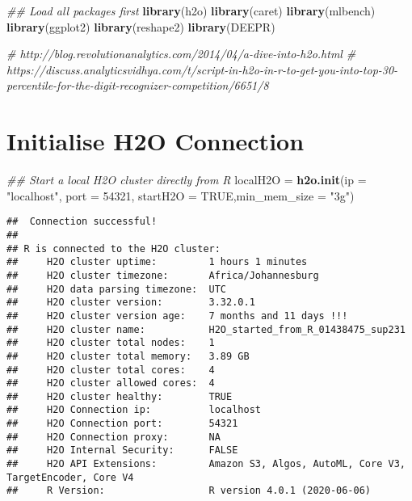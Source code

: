 \documentclass[
]{book}
\newenvironment{Shaded}{\begin{snugshade}}{\end{snugshade}}
\newcommand{\CommentTok}[1]{\textcolor[rgb]{0.56,0.35,0.01}{\textit{#1}}}
\newcommand{\DataTypeTok}[1]{\textcolor[rgb]{0.13,0.29,0.53}{#1}}
\newcommand{\DecValTok}[1]{\textcolor[rgb]{0.00,0.00,0.81}{#1}}
\newcommand{\KeywordTok}[1]{\textcolor[rgb]{0.13,0.29,0.53}{\textbf{#1}}}
\newcommand{\NormalTok}[1]{#1}
\newcommand{\OtherTok}[1]{\textcolor[rgb]{0.56,0.35,0.01}{#1}}
\newcommand{\StringTok}[1]{\textcolor[rgb]{0.31,0.60,0.02}{#1}}
\begin{document}
\begin{Shaded}
\begin{Highlighting}[]
\CommentTok{## Load all packages first}
\KeywordTok{library}\NormalTok{(h2o)}
\KeywordTok{library}\NormalTok{(caret)}
\KeywordTok{library}\NormalTok{(mlbench)}
\KeywordTok{library}\NormalTok{(ggplot2)}
\KeywordTok{library}\NormalTok{(reshape2)}
\KeywordTok{library}\NormalTok{(DEEPR)}

\CommentTok{# http://blog.revolutionanalytics.com/2014/04/a-dive-into-h2o.html}
\CommentTok{# https://discuss.analyticsvidhya.com/t/script-in-h2o-in-r-to-get-you-into-top-30-percentile-for-the-digit-recognizer-competition/6651/8}
\end{Highlighting}
\end{Shaded}

\hypertarget{initialise-h2o-connection}{%
\section{Initialise H2O Connection}\label{initialise-h2o-connection}}

\begin{Shaded}
\begin{Highlighting}[]
\CommentTok{## Start a local H2O cluster directly from R}
\NormalTok{localH2O =}\StringTok{ }\KeywordTok{h2o.init}\NormalTok{(}\DataTypeTok{ip =} \StringTok{"localhost"}\NormalTok{, }\DataTypeTok{port =} \DecValTok{54321}\NormalTok{, }\DataTypeTok{startH2O =} \OtherTok{TRUE}\NormalTok{,}\DataTypeTok{min_mem_size =} \StringTok{"3g"}\NormalTok{)}
\end{Highlighting}
\end{Shaded}

\begin{verbatim}
##  Connection successful!
## 
## R is connected to the H2O cluster: 
##     H2O cluster uptime:         1 hours 1 minutes 
##     H2O cluster timezone:       Africa/Johannesburg 
##     H2O data parsing timezone:  UTC 
##     H2O cluster version:        3.32.0.1 
##     H2O cluster version age:    7 months and 11 days !!! 
##     H2O cluster name:           H2O_started_from_R_01438475_sup231 
##     H2O cluster total nodes:    1 
##     H2O cluster total memory:   3.89 GB 
##     H2O cluster total cores:    4 
##     H2O cluster allowed cores:  4 
##     H2O cluster healthy:        TRUE 
##     H2O Connection ip:          localhost 
##     H2O Connection port:        54321 
##     H2O Connection proxy:       NA 
##     H2O Internal Security:      FALSE 
##     H2O API Extensions:         Amazon S3, Algos, AutoML, Core V3, TargetEncoder, Core V4 
##     R Version:                  R version 4.0.1 (2020-06-06)
\end{verbatim}
\end{document}
